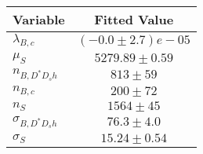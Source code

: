 \begin{tabular}[t]{lc}
\hline
Variable &Fitted Value\\
\hline\hline
$\lambda_{B,c}$&$(-0.0\pm2.7)e-05$\\
\hline
$\mu_S$&$5279.89\pm0.59$\\
\hline
$n_{B, D^* D_s h}$&$813\pm59$\\
\hline
$n_{B,c}$&$200\pm72$\\
\hline
$n_S$&$1564\pm45$\\
\hline
$\sigma_{B, D^* D_s h}$&$76.3\pm4.0$\\
\hline
$\sigma_S$&$15.24\pm0.54$\\
\hline
\end{tabular}